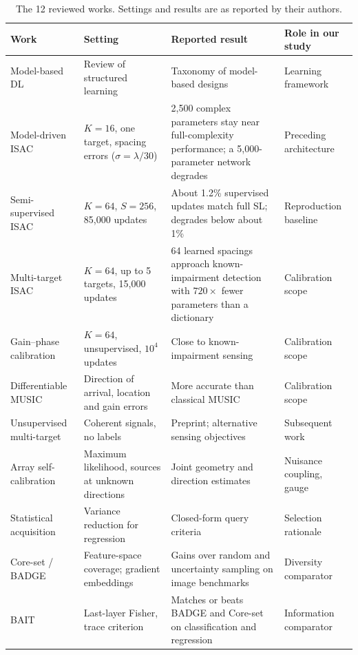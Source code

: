 \documentclass[conference]{IEEEtran}
\begin{document}
\begin{table}[t]\centering\small
\caption{The 12 reviewed works. Settings and results are as reported by their authors.}\label{tab:related}
\begin{tabularx}{\textwidth}{>{\raggedright\arraybackslash}p{3.2cm}YYp{3.1cm}}\toprule
Work & Setting & Reported result & Role in our study\\\midrule
Model-based DL~\cite{mbdl} & Review of structured learning & Taxonomy of model-based designs & Learning framework\\
Model-driven ISAC~\cite{icc} & $K=16$, one target, spacing errors ($\sigma=\lambda/30$) & 2,500 complex parameters stay near full-complexity performance; a 5,000-parameter network degrades & Preceding architecture\\
Semi-supervised ISAC~\cite{ssl} & $K=64$, $S=256$, 85,000 updates & About 1.2\% supervised updates match full SL; degrades below about 1\% & Reproduction baseline\\
Multi-target ISAC~\cite{multi} & $K=64$, up to 5 targets, 15,000 updates & 64 learned spacings approach known-impairment detection with $720\times$ fewer parameters than a dictionary & Calibration scope\\
Gain--phase calibration~\cite{gain} & $K=64$, unsupervised, $10^4$ updates & Close to known-impairment sensing & Calibration scope\\
Differentiable MUSIC~\cite{music} & Direction of arrival, location and gain errors & More accurate than classical MUSIC & Calibration scope\\
Unsupervised multi-target~\cite{multiul} & Coherent signals, no labels & Preprint; alternative sensing objectives & Subsequent work\\
Array self-calibration~\cite{weiss} & Maximum likelihood, sources at unknown directions & Joint geometry and direction estimates & Nuisance coupling, gauge\\
Statistical acquisition~\cite{cohn} & Variance reduction for regression & Closed-form query criteria & Selection rationale\\
Core-set / BADGE~\cite{coreset,badge} & Feature-space coverage; gradient embeddings & Gains over random and uncertainty sampling on image benchmarks & Diversity comparator\\
BAIT~\cite{bait} & Last-layer Fisher, trace criterion & Matches or beats BADGE and Core-set on classification and regression & Information comparator\\\bottomrule
\end{tabularx}
\end{table}
\end{document}
